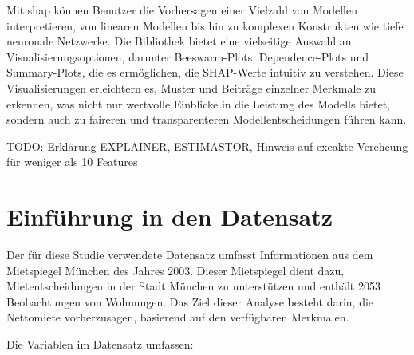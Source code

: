 Mit \textsf{shap} können Benutzer die Vorhersagen einer Vielzahl von Modellen interpretieren, 
von linearen Modellen bis hin zu komplexen Konstrukten wie tiefe neuronale Netzwerke. 
Die Bibliothek bietet eine vielseitige Auswahl an Visualisierungsoptionen, darunter Beeswarm-Plots, Dependence-Plots und 
Summary-Plots, die es ermöglichen, die SHAP-Werte intuitiv zu verstehen.
Diese Visualisierungen erleichtern es, Muster und Beiträge einzelner Merkmale zu erkennen, 
was nicht nur wertvolle Einblicke in die Leistung des Modells bietet, sondern auch zu faireren und transparenteren 
Modellentscheidungen führen kann. 

TODO: Erklärung EXPLAINER, ESTIMASTOR, Hinweis auf exeakte Verehcung für weniger als 10 Features

\section{Einführung in den Datensatz}

Der für diese Studie verwendete Datensatz umfasst Informationen aus dem Mietspiegel München des Jahres 2003. 
Dieser Mietspiegel dient dazu, Mietentscheidungen in der Stadt München zu unterstützen und enthält 
2053 Beobachtungen von Wohnungen. Das Ziel dieser Analyse besteht darin, die Nettomiete
vorherzusagen, basierend auf den verfügbaren Merkmalen.

Die Variablen im Datensatz umfassen:

